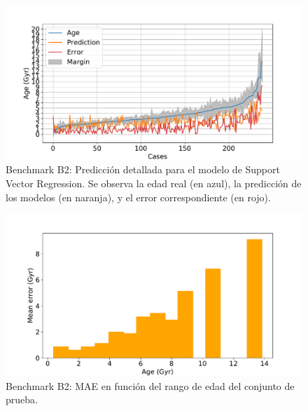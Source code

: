 \begin{figure}[H]
\begin{center}
 \includegraphics[width=0.8\linewidth]{Figuras/Experimentos/B_B2_svm_2.pdf}
\end{center}
\caption{Benchmark B2: Predicción detallada para el modelo de Support Vector Regression. Se observa la edad real (en azul), la predicción de los modelos (en naranja), y el error correspondiente (en rojo).}
 \label{fig:benchB2_details_svm_2}
\end{figure}

\begin{figure}[H]
\begin{center}
 \includegraphics[width=0.8\linewidth]{Figuras/Experimentos/B_B2_svm_3.pdf}
\end{center}
\caption{Benchmark B2: MAE en función del rango de edad del conjunto de prueba.}
 \label{fig:benchB2_details_svm_3}
\end{figure}

